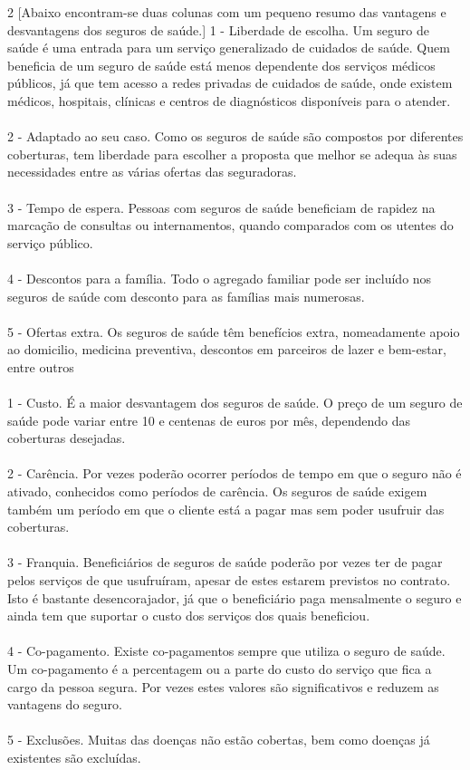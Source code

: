 \documentclass[11pt, a4paper]{article}
\begin{document}
\begin{multicols*}{2}
[Abaixo encontram-se duas colunas com um pequeno resumo das vantagens e desvantagens dos seguros de saúde.]
1 - Liberdade de escolha.
Um seguro de saúde é uma entrada para um serviço generalizado de cuidados de saúde. Quem beneficia de um seguro de saúde está menos dependente dos serviços médicos públicos, já que tem acesso a redes privadas de cuidados de saúde, onde existem médicos, hospitais, clínicas e centros de diagnósticos disponíveis para o atender.
\\
\\2 - Adaptado ao seu caso.
Como os seguros de saúde são compostos por diferentes coberturas, tem liberdade para escolher a proposta que melhor se adequa às suas necessidades entre as várias ofertas das seguradoras.
\\
\\3 - Tempo de espera.
Pessoas com seguros de saúde beneficiam de rapidez na marcação de consultas ou internamentos, quando comparados com os utentes do serviço público.
\\
\\4 - Descontos para a família.
Todo o agregado familiar pode ser incluído nos seguros de saúde com desconto para as famílias mais numerosas.
\\
\\5 - Ofertas extra.
Os seguros de saúde têm benefícios extra, nomeadamente apoio ao domicilio, medicina preventiva, descontos em parceiros de lazer e bem-estar, entre outros
\\
\\1 - Custo.
É a maior desvantagem dos seguros de saúde. O preço de um seguro de saúde pode variar entre 10 e centenas de euros por mês, dependendo das coberturas desejadas.
\\
\\2 - Carência.
Por vezes poderão ocorrer períodos de tempo em que o seguro não é ativado, conhecidos como períodos de carência. Os seguros de saúde exigem também um período em que o cliente está a pagar mas sem poder usufruir das coberturas.
\\
\\3 - Franquia.
Beneficiários de seguros de saúde poderão por vezes ter de pagar pelos serviços de que usufruíram, apesar de estes estarem previstos no contrato. Isto é bastante desencorajador, já que o beneficiário paga mensalmente o seguro e ainda tem que suportar o custo dos serviços dos quais beneficiou.
\\
\\4 - Co-pagamento.
Existe co-pagamentos sempre que utiliza o seguro de saúde. Um co-pagamento é a percentagem ou a parte do custo do serviço que fica a cargo da pessoa segura. Por vezes estes valores são significativos e reduzem as vantagens do seguro.
\\
\\5 - Exclusões.
Muitas das doenças não estão cobertas, bem como doenças já existentes são excluídas.
\end{multicols*}
\clearpage
\end{document}
